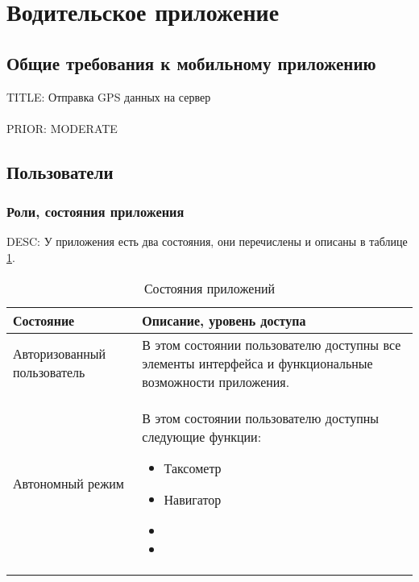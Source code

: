 \section{Водительское приложение}


  \subsection{Общие требования к мобильному приложению}

    TITLE: Отправка GPS данных на сервер\\
    \\
    PRIOR: MODERATE\\

  \subsection{Пользователи}

      \subsubsection{Роли, состояния приложения}

      		DESC: У приложения есть два состояния, они перечислены и описаны в таблице \ref{app_state}. 

             \begin{table}
             \begin{center}
             \label{app_state}
             \caption {Состояния приложений}
             \setlength{\extrarowheight}{2mm}
             \begin{tabular}{|p{5cm}|p{10cm}|}
                 \hline     \textbf{Состояние}&\textbf{Описание, уровень доступа} \\ [2mm]

                 \hline   Авторизованный пользователь & В этом состоянии пользователю доступны все элементы интерфейса и функциональные возможности приложения.\\ [2mm]
                 \hline   Автономный режим & В этом состоянии пользователю доступны следующие функции: \begin{itemize} \item Таксометр \item Навигатор \item \item\end{itemize}\\ [2mm]
                  \hline
             \end{tabular}
             \end{center}
             \end{table}

